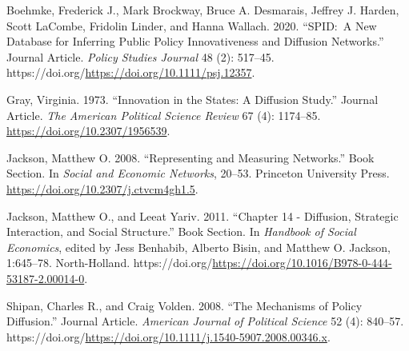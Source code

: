 \documentclass[
  letterpaper,
  DIV=11,
  numbers=noendperiod]{scrartcl}
\newlength{\cslhangindent}
\newlength{\cslentryspacingunit} %
\newenvironment{CSLReferences}[2] %
 {%
  \setlength{\parindent}{0pt}
  \ifodd #1
  \let\oldpar\par
  \def\par{\hangindent=\cslhangindent\oldpar}
  \fi
  \setlength{\parskip}{#2\cslentryspacingunit}
 }%
 {}
\begin{document}
\hypertarget{refs}{}
\begin{CSLReferences}{1}{0}
\leavevmode{}%
Boehmke, Frederick J., Mark Brockway, Bruce A. Desmarais, Jeffrey J.
Harden, Scott LaCombe, Fridolin Linder, and Hanna Wallach. 2020.
{``SPID:~A New Database for Inferring Public Policy Innovativeness and
Diffusion Networks.''} Journal Article. \emph{Policy Studies Journal} 48
(2): 517--45. https://doi.org/\url{https://doi.org/10.1111/psj.12357}.

\leavevmode{}%
Gray, Virginia. 1973. {``Innovation in the States: A Diffusion Study.''}
Journal Article. \emph{The American Political Science Review} 67 (4):
1174--85. \url{https://doi.org/10.2307/1956539}.

\leavevmode{}%
Jackson, Matthew O. 2008. {``Representing and Measuring Networks.''}
Book Section. In \emph{Social and Economic Networks}, 20--53. Princeton
University Press. \url{https://doi.org/10.2307/j.ctvcm4gh1.5}.

\leavevmode{}%
Jackson, Matthew O., and Leeat Yariv. 2011. {``Chapter 14 - Diffusion,
Strategic Interaction, and Social Structure.''} Book Section. In
\emph{Handbook of Social Economics}, edited by Jess Benhabib, Alberto
Bisin, and Matthew O. Jackson, 1:645--78. North-Holland.
https://doi.org/\url{https://doi.org/10.1016/B978-0-444-53187-2.00014-0}.

\leavevmode{}%
Shipan, Charles R., and Craig Volden. 2008. {``The Mechanisms of Policy
Diffusion.''} Journal Article. \emph{American Journal of Political
Science} 52 (4): 840--57.
https://doi.org/\url{https://doi.org/10.1111/j.1540-5907.2008.00346.x}.

\end{CSLReferences}
\end{document}
